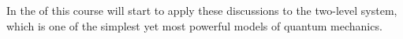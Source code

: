 In the \href{http://}{} of this course will start to apply these discussions to the two-level system, which is one of the simplest yet most powerful models of quantum mechanics.